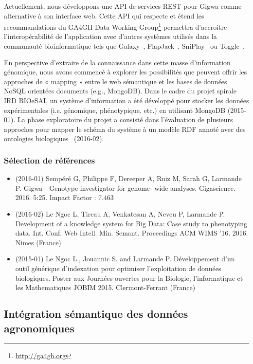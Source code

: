 Actuellement, nous développons une API de services REST pour Gigwa comme alternative à son interface web. Cette API qui respecte et étend les recommandations du GA4GH Data Working Group\footnote{\url{http://ga4gh.org}} permettra d’accroitre l’interopérabilité de l’application avec d’autres systèmes utilisés dans la communauté bioinformatique tels que Galaxy~\cite{Giardine2005,Goecks2010}, FlapJack~\cite{Milne2010}, SniPlay~\cite{Dereeper2015} ou Toggle~\cite{Monat2015}.


En perspective d’extraire de la connaissance dans cette masse d’information génomique, nous avons commencé à explorer les possibilités que peuvent offrir les approches de « mapping » entre le web sémantique et les bases de données NoSQL orientées documents (e.g., MongoDB). Dans le cadre du projet spirale IRD BIOeSAI, un système d’information a été développé pour stocker les données expérimentales (i.e. génomique, phénotypique, etc.) en utilisant MongoDB (2015-01). La phase exploratoire du projet a consisté dans l’évaluation de plusieurs approches pour mapper le schéma du système à un modèle RDF annoté avec des ontologies biologiques~\cite{Luyen:2016} (2016-02).



\subsubsection*{Sélection de références}

\begin{itemize}
\item (2016-01) Sempéré G, Philippe F, Dereeper A, Ruiz M, Sarah G, Larmande P. Gigwa—Genotype investigator for genome- wide analyses. Gigascience. 2016. 5:25. Impact Factor : 7.463
\item (2016-02) Le Ngoc L, Tireau A, Venkatesan A, Neveu P, Larmande P. Development of a knowledge system for Big Data: Case study to phenotyping data. Int. Conf. Web Intell. Min. Semant. Proceedings ACM WIMS ’16. 2016. Nimes (France)
\item (2015-01) Le Ngoc L., Jouannic S. and Larmande P. Développement d'un outil générique d'indexation pour optimiser l'exploitation de données biologiques. Poster aux Journées ouvertes pour la Biologie, l’informatique et les Mathematiques JOBIM 2015. Clermont-Ferrant (France)
\end{itemize}


\subsection*{Intégration sémantique des données agronomiques}
\label{IBC}


